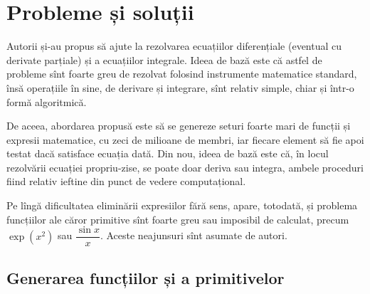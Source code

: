 
\chapter{Probleme și soluții}

Autorii și-au propus să ajute la rezolvarea ecuațiilor diferențiale
(eventual cu derivate parțiale) și a ecuațiilor integrale. Ideea de
bază este că astfel de probleme sînt foarte greu de rezolvat folosind
instrumente matematice standard, însă operațiile în sine, de derivare
și integrare, sînt relativ simple, chiar și într-o formă algoritmică.

De aceea, abordarea propusă este să se genereze seturi foarte mari
de funcții și expresii matematice, cu zeci de milioane de membri, iar
fiecare element să fie apoi testat dacă satisface ecuația dată. Din nou,
ideea de bază este că, în locul rezolvării ecuației propriu-zise, se poate
doar deriva sau integra, ambele proceduri fiind relativ ieftine din
punct de vedere computațional.

Pe lîngă dificultatea eliminării expresiilor fără sens, apare, totodată,
și problema funcțiilor ale căror primitive sînt foarte greu sau imposibil
de calculat, precum $ \exp(x^2) $ sau $ \dfrac{\sin x}{x} $. Aceste
neajunsuri sînt asumate de autori.

\section{Generarea funcțiilor și a primitivelor}

